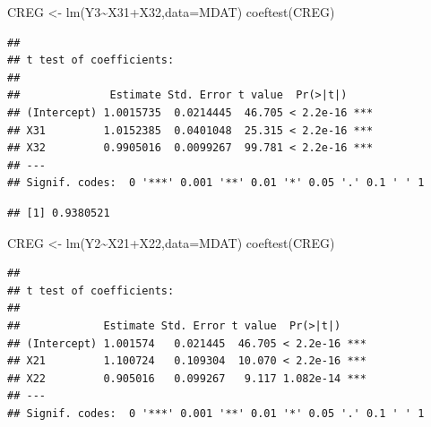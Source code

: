 \documentclass[
]{book}
\newenvironment{Shaded}{\begin{snugshade}}{\end{snugshade}}
\newcommand{\AttributeTok}[1]{\textcolor[rgb]{0.77,0.63,0.00}{#1}}
\newcommand{\CommentTok}[1]{\textcolor[rgb]{0.56,0.35,0.01}{\textit{#1}}}
\newcommand{\FunctionTok}[1]{\textcolor[rgb]{0.00,0.00,0.00}{#1}}
\newcommand{\NormalTok}[1]{#1}
\newcommand{\OtherTok}[1]{\textcolor[rgb]{0.56,0.35,0.01}{#1}}
\newcommand{\SpecialCharTok}[1]{\textcolor[rgb]{0.00,0.00,0.00}{#1}}
\begin{document}
\begin{Shaded}
\begin{Highlighting}[]
\NormalTok{CREG }\OtherTok{\textless{}{-}} \FunctionTok{lm}\NormalTok{(Y3}\SpecialCharTok{\textasciitilde{}}\NormalTok{X31}\SpecialCharTok{+}\NormalTok{X32,}\AttributeTok{data=}\NormalTok{MDAT)}
\FunctionTok{coeftest}\NormalTok{(CREG)}
\end{Highlighting}
\end{Shaded}

\begin{verbatim}
## 
## t test of coefficients:
## 
##              Estimate Std. Error t value  Pr(>|t|)    
## (Intercept) 1.0015735  0.0214445  46.705 < 2.2e-16 ***
## X31         1.0152385  0.0401048  25.315 < 2.2e-16 ***
## X32         0.9905016  0.0099267  99.781 < 2.2e-16 ***
## ---
## Signif. codes:  0 '***' 0.001 '**' 0.01 '*' 0.05 '.' 0.1 ' ' 1
\end{verbatim}

\begin{Shaded}
\end{Shaded}

\begin{verbatim}
## [1] 0.9380521
\end{verbatim}

\begin{Shaded}
\begin{Highlighting}[]
\NormalTok{CREG }\OtherTok{\textless{}{-}} \FunctionTok{lm}\NormalTok{(Y2}\SpecialCharTok{\textasciitilde{}}\NormalTok{X21}\SpecialCharTok{+}\NormalTok{X22,}\AttributeTok{data=}\NormalTok{MDAT)}
\FunctionTok{coeftest}\NormalTok{(CREG)}
\end{Highlighting}
\end{Shaded}

\begin{verbatim}
## 
## t test of coefficients:
## 
##             Estimate Std. Error t value  Pr(>|t|)    
## (Intercept) 1.001574   0.021445  46.705 < 2.2e-16 ***
## X21         1.100724   0.109304  10.070 < 2.2e-16 ***
## X22         0.905016   0.099267   9.117 1.082e-14 ***
## ---
## Signif. codes:  0 '***' 0.001 '**' 0.01 '*' 0.05 '.' 0.1 ' ' 1
\end{verbatim}
\end{document}
